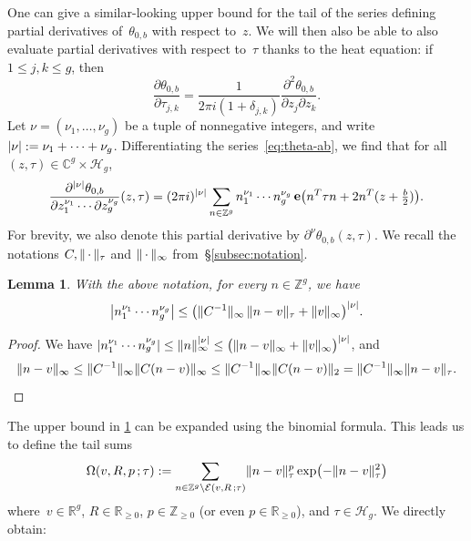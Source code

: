 \documentclass[12pt,oneside]{amsart}
\numberwithin{equation}{section}
\newtheorem{lem}[equation]{Lemma}
\theoremstyle{definition}
\newcommand{\Z}{\mathbb{Z}}
\newcommand{\R}{\mathbb{R}}
\newcommand{\C}{\mathbb{C}}
\newcommand{\Half}{\mathcal{H}}
\newcommand{\placeholder}{\,\cdot\,}
\newcommand{\eld}[3]{\ensuremath{\mathcal{E}(#1, #2\,; #3)}}
\newcommand{\tailsum}[4]{\ensuremath{\Omega(#1,#2,#3\,;#4)}}
\DeclareMathOperator{\e}{\mathbf{e}}
\DeclarePairedDelimiter{\abs}{|}{|}
\DeclarePairedDelimiter{\paren}{(}{)}
\DeclarePairedDelimiter{\norm}{\|}{\|}
\begin{document}
One can give a similar-looking upper bound for the tail of the series defining
partial derivatives of~$\theta_{0,b}$ with respect to~$z$. We will then also be
able to also evaluate partial derivatives with respect to~$\tau$ thanks to the
heat equation: if $1\leq j,k\leq g$, then
\begin{equation}
  \label{eq:heat}
  \frac{\partial \theta_{0,b}}{\partial \tau_{j,k}} = \frac{1}{2\pi i (1 + \delta_{j,k})} \frac{\partial^2 \theta_{0,b}}{\partial z_j \partial z_k}.
\end{equation}
Let $\nu = (\nu_1,\ldots,\nu_g)$ be a tuple of nonnegative integers, and write
$\abs{\nu} := \nu_1+\cdots + \nu_g$.  Differentiating the series~\eqref{eq:theta-ab},
we find that for all~$(z,\tau)\in \C^g\times\Half_g$,
\begin{equation}
  \label{eq:partial-series}
  \frac{\partial^{\abs{\nu}} \theta_{0,b}}{\partial z_1^{\nu_1}\cdots\partial z_{g}^{\nu_g}}(z,\tau)
  = (2 \pi i)^{\abs{\nu}}
  \sum_{n \in \Z^g} n_1^{\nu_1}\cdots n_{g}^{\nu_{g}}
  \e\paren[\big]{n^T\tau n + 2n^T(z + \tfrac b2)}.
\end{equation}
For brevity, we also denote this partial derivative by
$\partial^\nu \theta_{0,b}(z,\tau)$. We recall the notations
$C, \norm{\placeholder}_\tau$ and $\norm{\placeholder}_\infty$
from~§\ref{subsec:notation}.

\begin{lem}
  \label{lem:bound-derivatives}
  With the above notation, for every $n\in \Z^g$, we have
  \begin{displaymath}
    \abs[\big]{n_1^{\nu_1}\cdots n_g^{\nu_g}} \leq
    \paren[\big]{\norm{C^{-1}}_\infty \,\norm{n - v}_\tau
      + \norm{v}_\infty}^{\abs{\nu}}.
  \end{displaymath}
\end{lem}

\begin{proof}
  We have
  $\abs{n_1^{\nu_1}\cdots n_{g}^{\nu_{g}}} \leq \norm{n}_\infty^{\abs{\nu}}
  \leq \paren[\big]{\norm{n - v}_\infty + \norm{v}_\infty}^{\abs{\nu}}$, and
  \begin{displaymath}
    \norm{n-v}_\infty \leq \norm{C^{-1}}_\infty \norm{C (n-v)}_\infty \leq \norm{C^{-1}}_\infty \norm{C(n-v)}_2
    = \norm{C^{-1}}_\infty \norm{n-v}_\tau. \qedhere
  \end{displaymath}
\end{proof}

The upper bound in \cref{lem:bound-derivatives} can be expanded using the
binomial formula. This leads us to define the tail sums
\begin{equation}
  \label{eq:tailsum}
  \tailsum{v}{R}{p}{\tau} := \sum_{n\in \Z^g \setminus \eld{v}{R}{\tau}} \norm{n - v}_\tau^p \exp\paren[\big]{-\norm{n-v}_\tau^2}
\end{equation}
where~$v\in \R^g$, $R\in \R_{\geq 0}$, $p\in \Z_{\geq 0}$ (or even
$p\in \R_{\geq 0}$), and $\tau\in \Half_g$. We directly obtain:
\end{document}
